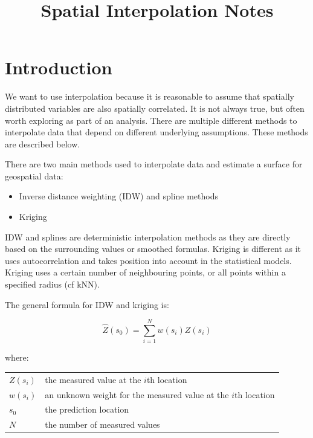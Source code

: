 \documentclass{article}
\title{Spatial Interpolation Notes}
\makeatletter
\newenvironment{conditions}[1][where:] 
  {#1 \begin{tabular}[t]{>{$}l<{$} @{${}={}$} l}}
  {\end{tabular}\\[\belowdisplayskip]}
\makeatother
\begin{document}
\maketitle

\section{Introduction}

We want to use interpolation because it is reasonable to assume that spatially distributed variables are also spatially correlated.
It is not always true, but often worth exploring as part of an analysis.
There are multiple different methods to interpolate data that depend on different underlying assumptions.
These methods are described below.

\begin{center}
\end{center}

There are two main methods used to interpolate data and estimate a surface for geospatial data:

\begin{itemize}
    \item Inverse distance weighting (IDW) and spline methods
    \item Kriging
\end{itemize}

IDW and splines are deterministic interpolation methods as they are directly based on the surrounding values or smoothed formulas.
Kriging is different as it uses autocorrelation and takes position into account in the statistical models.
Kriging uses a certain number of neighbouring points, or all points within a specified radius (cf kNN).

The general formula for IDW and kriging is:

\[\hat{Z}(s_{0} )=\sum_{i=1}^{N} w(s_{i}) Z (s_{i})\]

\begin{conditions}
Z(s_{i}) & the measured value at the $i$th location \\
w(s_{i}) & an unknown weight for the measured value at the $i$th location \\
s_{0} & the prediction location \\
N & the number of measured values
\end{conditions}
\end{document}
